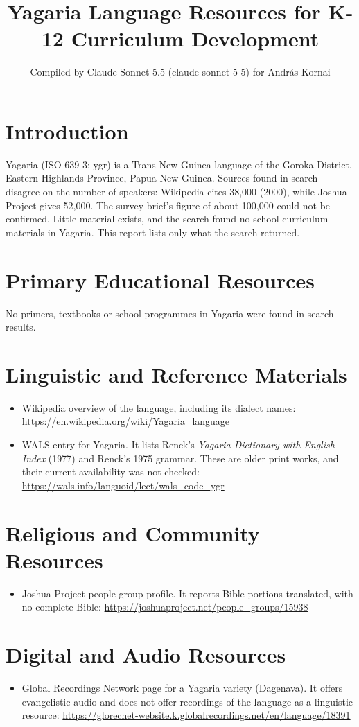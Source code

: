 \documentclass[12pt]{article}
\title{Yagaria Language Resources for K-12 Curriculum Development}
\author{Compiled by Claude Sonnet 5.5 (claude-sonnet-5-5) for Andr\'as Kornai}
\date{}
\begin{document}
\maketitle

\section{Introduction}
Yagaria (ISO 639-3: ygr) is a Trans-New Guinea language of the Goroka District, Eastern Highlands Province, Papua New Guinea. Sources found in search disagree on the number of speakers: Wikipedia cites 38,000 (2000), while Joshua Project gives 52,000. The survey brief's figure of about 100,000 could not be confirmed. Little material exists, and the search found no school curriculum materials in Yagaria. This report lists only what the search returned.

\section{Primary Educational Resources}
No primers, textbooks or school programmes in Yagaria were found in search results.

\section{Linguistic and Reference Materials}
\begin{itemize}
\item Wikipedia overview of the language, including its dialect names: \url{https://en.wikipedia.org/wiki/Yagaria_language}
\item WALS entry for Yagaria. It lists Renck's \emph{Yagaria Dictionary with English Index} (1977) and Renck's 1975 grammar. These are older print works, and their current availability was not checked: \url{https://wals.info/languoid/lect/wals_code_ygr}
\end{itemize}

\section{Religious and Community Resources}
\begin{itemize}
\item Joshua Project people-group profile. It reports Bible portions translated, with no complete Bible: \url{https://joshuaproject.net/people_groups/15938}
\end{itemize}

\section{Digital and Audio Resources}
\begin{itemize}
\item Global Recordings Network page for a Yagaria variety (Dagenava). It offers evangelistic audio and does not offer recordings of the language as a linguistic resource: \url{https://glorecnet-website.k.globalrecordings.net/en/language/18391}
\end{itemize}
\end{document}
